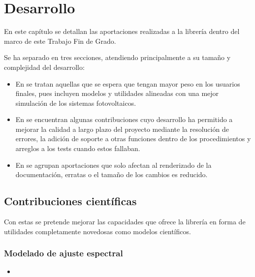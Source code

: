 \chapter{Desarrollo} \label{chp:desarrollo}

En este capítulo se detallan las aportaciones realizadas a la librería \pvlibpy{} dentro del marco de este Trabajo Fin de Grado.

Se ha separado en tres secciones, atendiendo principalmente a su tamaño y complejidad del desarrollo:

\begin{itemize}
    \item En  se tratan aquellas que se espera que tengan mayor peso en los usuarios finales, pues incluyen modelos y utilidades alineadas con una mejor simulación de los sistemas fotovoltaicos.
    \item En  se encuentran algunas contribuciones cuyo desarrollo ha permitido a mejorar la calidad a largo plazo del proyecto mediante la resolución de errores, la adición de soporte a otras funciones dentro de los procedimientos y arreglos a los tests cuando estos fallaban.
    \item En  se agrupan aportaciones que solo afectan al renderizado de la documentación, erratas o el tamaño de los cambios es reducido.
\end{itemize}

\section{Contribuciones científicas} \label{sct:desarrollo:contribuciones_cientificas}

Con estas se pretende mejorar las capacidades que ofrece la librería \pvlibpy{} en forma de utilidades completamente novedosas como modelos científicos.

\subsection{Modelado de ajuste espectral}

\begin{itemize}
    \item {}
\end{itemize}

